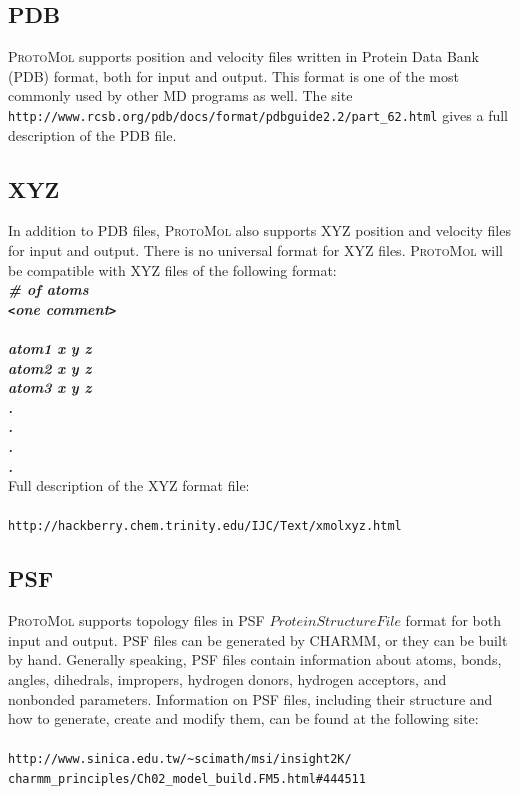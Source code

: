 \documentclass[11pt]{report}
\newcommand{\ProtoMol}{\textsc{ProtoMol }}
\newcommand{\tempstart}{\texttt{<}}
\newcommand{\tempend}{\texttt{>}}
\providecommand{\ttsmall}[1]{\texttt{\small\mbox{#1}}}
\begin{document}
\subsection{PDB}

\ProtoMol supports position and velocity files written in Protein Data
Bank (PDB) format, both for input and output.  This format is one of
the most commonly used by other MD programs as well.   The site
\texttt
{http://www.rcsb.org/pdb/docs/format/pdbguide2.2/part\_62.html} gives
a full description of the PDB file.

\subsection{XYZ}

In addition to PDB files, \ProtoMol also supports XYZ position and
velocity files for input and output.  There is no universal format for
XYZ files. \ProtoMol will be compatible with XYZ files of the
following format:
\\
{\bf \it \# of atoms }\\
{\bf \it \indent \tempstart one comment\tempend  }\\ \\
{\bf \it \indent atom1   x   y   z }\\
{\bf \it \indent atom2   x   y   z }\\
{\bf \it \indent atom3   x   y   z }\\
{\bf \it \indent \indent \indent . }\\
{\bf \it \indent \indent \indent . }\\
{\bf \it \indent \indent \indent . }\\
{\bf \it \indent \indent \indent . }\\
\newline
\newline
Full description of the XYZ format file:\\ \\
\ttsmall{http://hackberry.chem.trinity.edu/IJC/Text/xmolxyz.html}

\subsection{PSF}

\ProtoMol supports topology files in PSF \(Protein Structure File\)
format for both input and output.  PSF files can be generated by
CHARMM, or they can be built by hand.  Generally speaking, PSF files
contain information about atoms, bonds, angles, dihedrals, impropers,
hydrogen donors, hydrogen acceptors, and nonbonded parameters.
Information on PSF files, including their structure and how to
generate, create and modify them, can be found at the following site: 
\\ 
\\
\texttt {http://www.sinica.edu.tw/\~{ }scimath/msi/insight2K/\\
charmm\_principles/Ch02\_model\_build.FM5.html\#444511}
\end{document}
